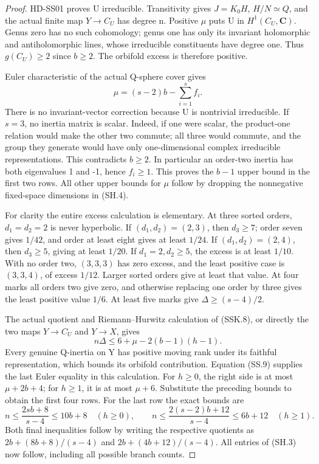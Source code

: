 \begin{proof}
HD-SS01 proves U irreducible. Transitivity gives \(J=K_0H\),
\(H/N\simeq Q\), and the actual finite map \(Y\to C_U\)
has degree n. Positive \(\mu\) puts U in \(H^1(C_U,\mathbf C)\).
Genus zero has no such cohomology; genus one has only its invariant
holomorphic and antiholomorphic lines, whose irreducible constituents
have degree one. Thus \(g(C_U)\ge2\) since \(b\ge2\).
The orbifold excess is therefore positive.

Euler characteristic of the actual Q-sphere cover gives
\[
 \mu=(s-2)b-\sum_{i=1}^s f_i.
 \tag{SH.4}
\]
There is no invariant-vector correction because U is nontrivial
irreducible. If \(s=3\), no inertia matrix is scalar. Indeed, if
one were scalar, the product-one relation would make the other two
commute; all three would commute, and the group they generate would
have only one-dimensional complex irreducible representations.
This contradicts \(b\ge2\). In particular an order-two inertia
has both eigenvalues 1 and -1, hence \(f_i\ge1\).
This proves the \(b-1\) upper bound in the first two rows.
All other upper bounds for \(\mu\) follow by dropping the
nonnegative fixed-space dimensions in (SH.4).

For clarity the entire excess calculation is elementary.
At three sorted orders, \(d_1=d_2=2\) is never hyperbolic.
If \((d_1,d_2)=(2,3)\), then \(d_3\ge7\); order seven
gives \(1/42\), and order at least eight gives at least \(1/24\).
If \((d_1,d_2)=(2,4)\), then \(d_3\ge5\), giving at least
\(1/20\). If \(d_1=2,d_2\ge5\), the excess is at least
\(1/10\). With no order two, \((3,3,3)\) has zero excess,
and the least positive case is \((3,3,4)\), of excess \(1/12\).
Larger sorted orders give at least that value. At four marks all
orders two give zero, and otherwise replacing one order by three
gives the least positive value \(1/6\). At least five marks give
\(\Delta\ge(s-4)/2\).

The actual quotient and Riemann--Hurwitz calculation of (SSK.8),
or directly the two maps \(Y\to C_U\) and \(Y\to X\), gives
\[
 n\Delta\le 6+\mu-2(b-1)(h-1).
 \tag{SH.5}
\]
Every genuine Q-inertia on Y has positive moving rank under its
faithful representation, which bounds its orbifold contribution.
Equation (SS.9) supplies the last Euler equality in this calculation.
For \(h\ge0\), the right side is at most \(\mu+2b+4\);
for \(h\ge1\), it is at most \(\mu+6\).
Substitute the preceding bounds to obtain the first four rows.
For the last row the exact bounds are
\[
 n\le \frac{2sb+8}{s-4}\le10b+8\quad(h\ge0),\qquad
 n\le \frac{2(s-2)b+12}{s-4}\le6b+12\quad(h\ge1).
 \tag{SH.6}
\]
Both final inequalities follow by writing the respective quotients
as \(2b+(8b+8)/(s-4)\) and \(2b+(4b+12)/(s-4)\).
All entries of (SH.3) now follow, including all possible branch counts.
\end{proof}

